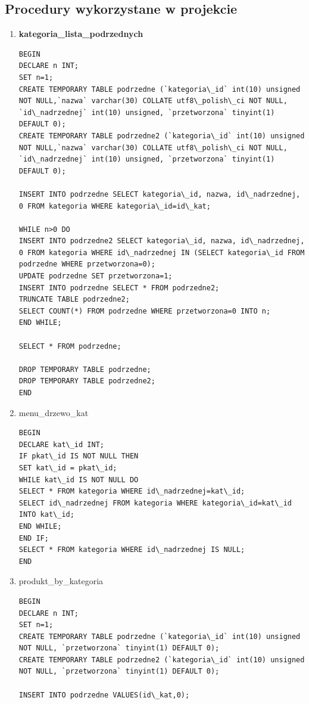 \subsection{Procedury wykorzystane w projekcie}
\begin{enumerate}
\item \textbf{kategoria\_lista\_podrzednych}
\begin{verbatim}
BEGIN
DECLARE n INT;
SET n=1;
CREATE TEMPORARY TABLE podrzedne (`kategoria\_id` int(10) unsigned NOT NULL,`nazwa` varchar(30) COLLATE utf8\_polish\_ci NOT NULL,
`id\_nadrzednej` int(10) unsigned, `przetworzona` tinyint(1) DEFAULT 0);
CREATE TEMPORARY TABLE podrzedne2 (`kategoria\_id` int(10) unsigned NOT NULL,`nazwa` varchar(30) COLLATE utf8\_polish\_ci NOT NULL,
`id\_nadrzednej` int(10) unsigned, `przetworzona` tinyint(1) DEFAULT 0);

INSERT INTO podrzedne SELECT kategoria\_id, nazwa, id\_nadrzednej, 0 FROM kategoria WHERE kategoria\_id=id\_kat;

WHILE n>0 DO
INSERT INTO podrzedne2 SELECT kategoria\_id, nazwa, id\_nadrzednej, 0 FROM kategoria WHERE id\_nadrzednej IN (SELECT kategoria\_id FROM podrzedne WHERE przetworzona=0);
UPDATE podrzedne SET przetworzona=1;
INSERT INTO podrzedne SELECT * FROM podrzedne2;
TRUNCATE TABLE podrzedne2;
SELECT COUNT(*) FROM podrzedne WHERE przetworzona=0 INTO n;
END WHILE;

SELECT * FROM podrzedne;

DROP TEMPORARY TABLE podrzedne;
DROP TEMPORARY TABLE podrzedne2;
END
\end{verbatim}
\item menu\_drzewo\_kat
\begin{verbatim}
BEGIN
DECLARE kat\_id INT;
IF pkat\_id IS NOT NULL THEN
SET kat\_id = pkat\_id;
WHILE kat\_id IS NOT NULL DO
SELECT * FROM kategoria WHERE id\_nadrzednej=kat\_id;
SELECT id\_nadrzednej FROM kategoria WHERE kategoria\_id=kat\_id INTO kat\_id;
END WHILE;
END IF;
SELECT * FROM kategoria WHERE id\_nadrzednej IS NULL;
END
\end{verbatim}
\item produkt\_by\_kategoria
\begin{verbatim}
BEGIN
DECLARE n INT;
SET n=1;
CREATE TEMPORARY TABLE podrzedne (`kategoria\_id` int(10) unsigned NOT NULL, `przetworzona` tinyint(1) DEFAULT 0);
CREATE TEMPORARY TABLE podrzedne2 (`kategoria\_id` int(10) unsigned NOT NULL, `przetworzona` tinyint(1) DEFAULT 0);

INSERT INTO podrzedne VALUES(id\_kat,0);


\end{verbatim}
\end{enumerate}
